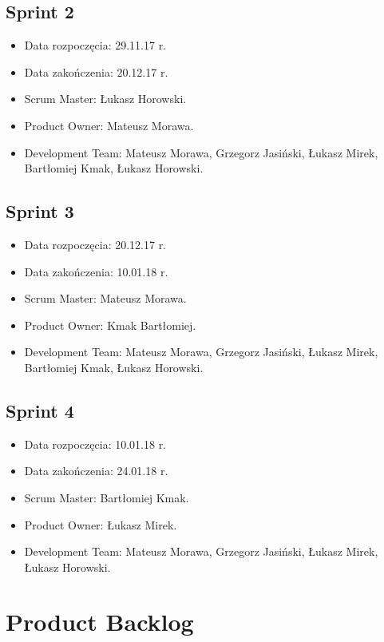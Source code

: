 \documentclass[a4paper]{article}
\begin{document}
\subsection{Sprint 2}

\begin{itemize}
\item Data rozpoczęcia: 29.11.17 r.
\item Data zakończenia: 20.12.17 r.
\item Scrum Master: Łukasz Horowski.
\item Product Owner: Mateusz Morawa.
\item Development Team:  Mateusz Morawa, Grzegorz Jasiński, Łukasz Mirek, Bartłomiej Kmak, Łukasz Horowski.
\end{itemize}

\subsection{Sprint 3}

\begin{itemize}
\item Data rozpoczęcia: 20.12.17 r.
\item Data zakończenia: 10.01.18 r.
\item Scrum Master: Mateusz Morawa.
\item Product Owner: Kmak Bartłomiej.
\item Development Team: Mateusz Morawa, Grzegorz Jasiński, Łukasz Mirek, Bartłomiej Kmak, Łukasz Horowski.
\end{itemize}

\subsection{Sprint 4}

\begin{itemize}
\item Data rozpoczęcia: 10.01.18 r.
\item Data zakończenia: 24.01.18 r.
\item Scrum Master: Bartłomiej Kmak.
\item Product Owner: Łukasz Mirek.
\item Development Team: Mateusz Morawa, Grzegorz Jasiński, Łukasz Mirek, Łukasz Horowski.
\end{itemize}

\section{Product Backlog}
\end{document}
